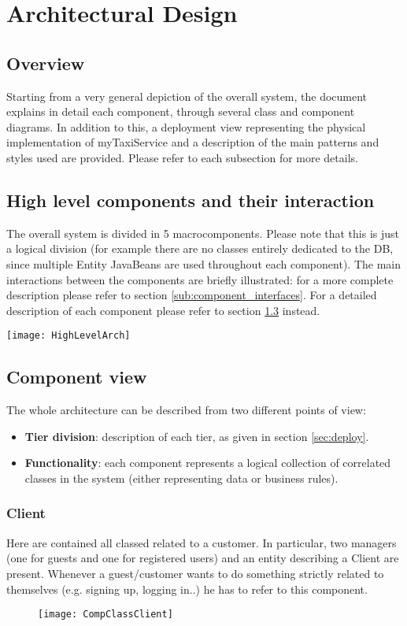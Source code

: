 \pagebreak
\section{Architectural Design}
 
\subsection{Overview}
Starting from a very general depiction of the overall system, the document explains in detail each component, through several class and component diagrams. In addition to this, a deployment view representing the physical implementation of myTaxiService and a description of the main patterns and styles used are provided. Please refer to each subsection for more details.

\newpage
\subsection{High level components and their interaction}
The overall system is divided in 5 macrocomponents. Please note that this is just a logical division (for example there are no classes entirely dedicated to the DB, since multiple Entity JavaBeans are used throughout each component). The main interactions between the components are briefly illustrated: for a more complete description please refer to section \ref{sub:component_interfaces}. For a detailed description of each component please refer to section \ref{sub:component_view} instead.


    \texttt{[image: HighLevelArch]}


\newpage
\subsection{Component view}
\label{sub:component_view}
The whole architecture can be described from two different points of view: 
\begin{itemize}
	\item \textbf{Tier division}: description of each tier, as given in section \ref{sec:deploy}.
	\item \textbf{Functionality}: each component represents a logical collection of correlated classes in the system (either representing data or business rules).
\end{itemize}

\newpage
\subsubsection{Client} %
Here are contained all classed related to a customer. In particular, two managers (one for guests and one for registered users) and an entity describing a Client are present. Whenever a guest/customer wants to do something strictly related to themselves (e.g. signing up, logging in..) he has to refer to this component.
\begin{figure}[hb]
    \centering
    \texttt{[image: CompClassClient]}
\end{figure}
        
